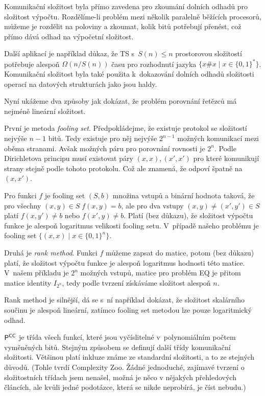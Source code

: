 Komunikační složitost byla přímo zavedena pro zkoumání dolních odhadů
pro složitost výpočtu. Rozdělíme-li problém mezi několik paralelně
běžících procesorů, můžeme je rozdělit na poloviny a zkoumat, kolik bitů
potřebují přenést, což přímo dává odhad na výpočetní složitost.

Další aplikací je například důkaz, že TS s~$S(n) \leq n$ prostorovou složitostí
potřebuje alespoň $\Omega(n / S(n))$ času pro rozhodnutí jazyka
$\{ x\#x \mid x \in \{0,1\}^* \}$. Komunikační složitost byla také
použita k~dokazování dolních odhadů složitosti operací na datových
strukturách jako jsou haldy.

Nyní ukážeme dva způsoby jak dokázat, že problém porovnání řetězců má
nejméně lineární složitost.

První je metoda {\em fooling set}.
Předpokládejme, že existuje protokol se složitostí nejvýše $n-1$ bitů.
Tedy existuje pro něj nejvýše $2^{n-1}$ možných komunikací mezi oběma
stranami. Avšak možných páru pro porovnání rovnosti je $2^n$.
Podle Dirichletova principu musí existovat páry $(x,x), (x',x')$ pro
které komunikují strany stejně podle tohoto protokolu.
Což ale znamená, že odpoví špatně na $(x,x')$.

Pro funkci $f$ je fooling set $(S,b)$ množina vstupů
a binární hodnota taková, že pro všechny $(x,y) \in S \; f(x,y) = b$,
ale pro dva vstupy $(x,y) \neq (x',y') \in S$ platí
$f(x,y') \neq b$ nebo $f(x',y) \neq b$.
Platí (bez důkazu), že složitost výpočtu funkce je alespoň logaritmus velikosti
fooling setu.
V~případě našeho problému je fooling set $\{(x,x) \mid x \in \{0,1\}^n \}$.


Druhá je {\em rank method}. Funkci $f$ můžeme zapsat do matice,
potom (bez důkazu) platí, že složitost výpočtu funkce je alespoň
logaritmus hodnosti této matice. V~našem příkladu je $2^n$ možných
vstupů, matice pro problém EQ je přitom matice identity $I_{2^n}$,
tedy podle tvrzení získáváme složitost alespoň $n$.

Rank method je silnější, dá se s~ní například dokázat, že složitost
skalárního součinu je alespoň lineární, zatímco fooling set metodou lze
pouze logaritmický odhad.

${\mathsf{P}}^{{\mathsf{CC}}}$ je třída všech funkcí, které jsou vyčíslitelné
v~polynomiálním počtem vyměněných bitů. Stejným způsobem se definují
další třídy komunikační složitosti. Většinou platí inkluze známe ze
standardní složitosti, a to ze stejných důvodů. (Tohle tvrdí Complexity
Zoo. Žádné jednoduché, zajímavé tvrzení o složitostních třídach jsem
nenašel, možná je něco v nějakých přehledových článcích, ale kvůli jedné
podotázce, která se nikde neprobírá, je číst nebudu.)


